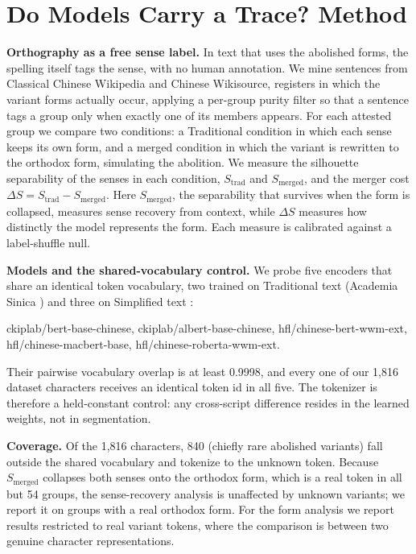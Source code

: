 \documentclass[10pt,twocolumn]{article}
\begin{document}
\section{Do Models Carry a Trace? Method}
\noindent\textbf{Orthography as a free sense label.} In text that uses the
abolished forms, the spelling itself tags the sense, with no human annotation. We
mine sentences from Classical Chinese Wikipedia and Chinese Wikisource, registers
in which the variant forms actually occur, applying a per-group purity filter so
that a sentence tags a group only when exactly one of its members appears. For
each attested group we compare two conditions: a Traditional condition in which
each sense keeps its own form, and a merged condition in which the variant is
rewritten to the orthodox form, simulating the abolition. We measure the
silhouette separability of the senses in each condition, $S_{\mathrm{trad}}$ and
$S_{\mathrm{merged}}$, and the merger cost $\Delta S = S_{\mathrm{trad}} -
S_{\mathrm{merged}}$. Here $S_{\mathrm{merged}}$, the separability that survives
when the form is collapsed, measures sense recovery from context, while $\Delta S$
measures how distinctly the model represents the form. Each measure is calibrated
against a label-shuffle null.

\noindent\textbf{Models and the shared-vocabulary control.} We probe five
encoders that share an identical token vocabulary, two trained on Traditional
text (Academia Sinica \cite{ckip}) and three on Simplified text \cite{cui2021}:

{\raggedright\small\ttfamily\noindent
ckiplab/bert-base-chinese, ckiplab/albert-base-chinese,
hfl/chinese-bert-wwm-ext, hfl/chinese-macbert-base,
hfl/chinese-roberta-wwm-ext.\par}

\noindent Their pairwise vocabulary overlap is at least 0.9998, and every one of
our 1,816 dataset characters receives an identical token id in all five. The
tokenizer is therefore a held-constant control: any cross-script difference
resides in the learned weights, not in segmentation.

\noindent\textbf{Coverage.} Of the 1,816 characters, 840 (chiefly rare abolished
variants) fall outside the shared vocabulary and tokenize to the unknown token.
Because $S_{\mathrm{merged}}$ collapses both senses onto the orthodox form, which
is a real token in all but 54 groups, the sense-recovery analysis is unaffected
by unknown variants; we report it on groups with a real orthodox form. For the
form analysis we report results restricted to real variant tokens, where the
comparison is between two genuine character representations.
\end{document}
